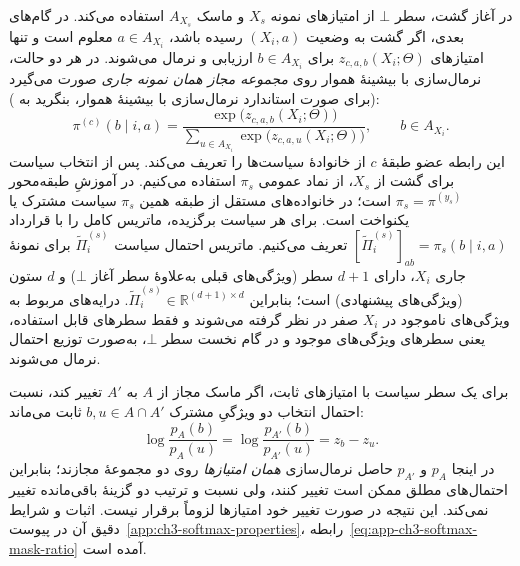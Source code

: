 در آغاز گشت، سطر $\bot$ از امتیازهای نمونه $X_s$ و ماسک
$A_{X_s}$ استفاده می‌کند. در گام‌های بعدی، اگر گشت به وضعیت
$(X_i,a)$ رسیده باشد، $a\in A_{X_i}$ معلوم است و تنها
امتیازهای $z_{c,a,b}(X_i;\Theta)$ برای $b\in A_{X_i}$
ارزیابی و نرمال می‌شوند. در هر دو حالت، نرمال‌سازی با بیشینهٔ هموار روی
\emph{مجموعه مجاز همان نمونه جاری} صورت می‌گیرد (برای صورت استاندارد نرمال‌سازی با بیشینهٔ هموار، بنگرید به \cite{GoodfellowBengioCourville2016DeepLearning}):
\begin{equation}\label{cmp:eq:ch3-fixed-policy-softmax}
\boxed{
\pi^{(c)}(b\mid i,a)
=\frac{\exp\bigl(z_{c,a,b}(X_i;\Theta)\bigr)}
{\sum\limits_{u\in A_{X_i}}
\exp\bigl(z_{c,a,u}(X_i;\Theta)\bigr)},
\qquad b\in A_{X_i}.
}
\end{equation}
این رابطه عضو طبقهٔ $c$ از خانوادهٔ سیاست‌ها را
تعریف می‌کند. پس از انتخاب سیاست برای گشت از
$X_s$، از نماد عمومی $\pi_s$ استفاده می‌کنیم.
در آموزشِ طبقه‌محور $\pi_s=\pi^{(y_s)}$ است؛
در خانواده‌های مستقل از طبقه همین $\pi_s$ سیاست
مشترک یا یکنواخت است. برای هر سیاست برگزیده،
ماتریس کامل را با قرارداد
$[\widetilde\Pi_i^{(s)}]_{ab}=\pi_s(b\mid i,a)$
تعریف می‌کنیم.
ماتریس احتمال سیاست $\widetilde\Pi_i^{(s)}$ برای نمونهٔ جاری
$X_i$، دارای $d+1$ سطر (ویژگی‌های قبلی به‌علاوهٔ سطر آغاز
$\bot$) و $d$ ستون (ویژگی‌های پیشنهادی) است؛ بنابراین
$\widetilde\Pi_i^{(s)}\in\mathbb R^{(d+1)\times d}$.
درایه‌های مربوط به ویژگی‌های ناموجود در $X_i$ صفر
در نظر گرفته می‌شوند و فقط سطرهای قابل استفاده،
یعنی سطرهای ویژگی‌های موجود و در گام نخست سطر $\bot$،
به‌صورت توزیع احتمال نرمال می‌شوند.

برای یک سطر سیاست با امتیازهای ثابت، اگر ماسک مجاز از $A$ به $A'$
تغییر کند، نسبت احتمال انتخاب دو ویژگیِ مشترک $b,u\in A\cap A'$
ثابت می‌ماند:
\begin{equation}\label{cmp:eq:ch3-masked-softmax-log-ratio}
\log\frac{p_A(b)}{p_A(u)}
=\log\frac{p_{A'}(b)}{p_{A'}(u)}
=z_b-z_u.
\end{equation}
در اینجا $p_A$ و $p_{A'}$ حاصل نرمال‌سازی \emph{همان امتیازها}
روی دو مجموعهٔ مجازند؛ بنابراین احتمال‌های مطلق ممکن است تغییر کنند،
ولی نسبت و ترتیب دو گزینهٔ باقی‌مانده تغییر نمی‌کند.
این نتیجه در صورت تغییر خود امتیازها لزوماً برقرار نیست.
اثبات و شرایط دقیق آن در پیوست~\ref{app:ch3-softmax-properties}،
رابطه~\eqref{eq:app-ch3-softmax-mask-ratio} آمده است.

